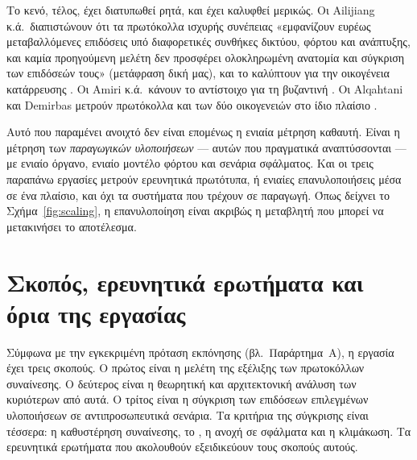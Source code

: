 Το κενό, τέλος, έχει διατυπωθεί ρητά, και έχει καλυφθεί μερικώς. Οι
Ailijiang κ.ά.\ διαπιστώνουν ότι τα πρωτόκολλα ισχυρής συνέπειας
«εμφανίζουν ευρέως μεταβαλλόμενες επιδόσεις υπό διαφορετικές συνθήκες
δικτύου, φόρτου και ανάπτυξης, και καμία προηγούμενη μελέτη δεν προσφέρει
ολοκληρωμένη ανατομία και σύγκριση των επιδόσεών τους» (μετάφραση δική
μας), και το καλύπτουν για την οικογένεια κατάρρευσης
\cite{ailijiang2019dissecting}. Οι Amiri κ.ά.\ κάνουν το αντίστοιχο για
τη βυζαντινή \cite{amiri2024bedrock}. Οι Alqahtani και Demirbas μετρούν
πρωτόκολλα και των δύο οικογενειών στο ίδιο πλαίσιο
\cite{alqahtani2021bottlenecks}.

Αυτό που παραμένει ανοιχτό δεν είναι επομένως η ενιαία μέτρηση καθαυτή.
Είναι η μέτρηση των \emph{παραγωγικών υλοποιήσεων} --- αυτών που
πραγματικά αναπτύσσονται --- με ενιαίο όργανο, ενιαίο μοντέλο φόρτου και
σενάρια σφάλματος. Και οι τρεις παραπάνω εργασίες μετρούν ερευνητικά
πρωτότυπα, ή ενιαίες επανυλοποιήσεις μέσα σε ένα πλαίσιο, και όχι τα
συστήματα που τρέχουν σε παραγωγή. Όπως δείχνει το
Σχήμα~\ref{fig:scaling}, η επανυλοποίηση είναι ακριβώς η μεταβλητή που
μπορεί να μετακινήσει το αποτέλεσμα.

\section{Σκοπός, ερευνητικά ερωτήματα και όρια της εργασίας}
\label{sec:aims}

Σύμφωνα με την εγκεκριμένη πρόταση εκπόνησης (βλ.\ Παράρτημα~Α), η
εργασία έχει τρεις σκοπούς. Ο πρώτος είναι η μελέτη της εξέλιξης των
πρωτοκόλλων συναίνεσης. Ο δεύτερος είναι η θεωρητική και αρχιτεκτονική
ανάλυση των κυριότερων από αυτά. Ο τρίτος είναι η σύγκριση των επιδόσεων
επιλεγμένων υλοποιήσεων σε αντιπροσωπευτικά σενάρια. Τα κριτήρια της
σύγκρισης είναι τέσσερα: η καθυστέρηση συναίνεσης, το , η
ανοχή σε σφάλματα και η κλιμάκωση. Τα ερευνητικά ερωτήματα που
ακολουθούν εξειδικεύουν τους σκοπούς αυτούς.

